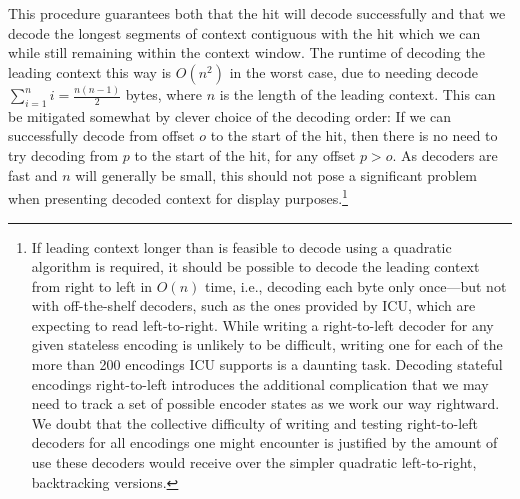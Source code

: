 \documentclass[5p,final,number,sort&compress]{elsarticle}
\begin{document}
This procedure guarantees both that the hit will decode successfully and that we decode the longest segments of context contiguous with the hit which we can while still remaining within the context window. The runtime of decoding the leading context this way is $O(n^2)$ in the worst case, due to needing decode $\sum^n_{i=1} i = \frac{n(n-1)}{2}$ bytes, where $n$ is the length of the leading context. This can be mitigated somewhat by clever choice of the decoding order: If we can successfully decode from offset $o$ to the start of the hit, then there is no need to try decoding from $p$ to the start of the hit, for any offset $p > o$. As decoders are fast and $n$ will generally be small, this should not pose a significant problem when presenting decoded context for display purposes.\footnote{If leading context longer than is feasible to decode using a quadratic algorithm is required, it should be possible to decode the leading context from right to left in $O(n)$ time, i.e., decoding each byte only once---but not with off-the-shelf decoders, such as the ones provided by ICU, which are expecting to read left-to-right. While writing a right-to-left decoder for any given stateless encoding is unlikely to be difficult, writing one for each of the more than 200 encodings ICU supports is a daunting task. Decoding stateful encodings right-to-left introduces the additional complication that we may need to track a set of possible encoder states as we work our way rightward. We doubt that the collective difficulty of writing and testing right-to-left decoders for all encodings one might encounter is justified by the amount of use these decoders would receive over the simpler quadratic left-to-right, backtracking versions.}
\end{document}
